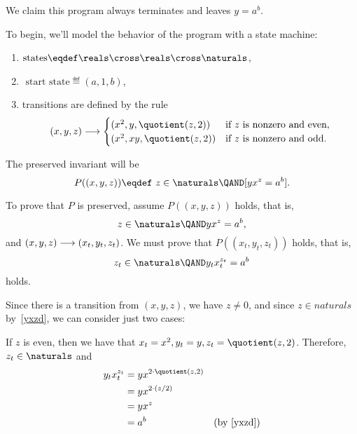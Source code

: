 
We claim this program always terminates and leaves $y = a^b$.

To begin, we'll model the behavior of the program with a state
machine:
\begin{enumerate}
\item $\text{states} \eqdef \reals \cross \reals \cross \naturals$,
\item $ \text{ start state} \eqdef (a,1,b)$,
\item transitions are defined by the rule
\begin{equation*}
(x,y,z) \movesto
\begin{cases}
(x^2, y, \quotient(z,2)) & \text{if $z$ is nonzero and even},\\
(x^2, xy, \quotient(z,2)) & \text{if $z$ is nonzero and odd}.
\end{cases}
\end{equation*}
\end{enumerate}

The preserved invariant will be
\[
P((x,y,z)) \eqdef\ z \in \naturals \QAND [yx^z = a^b].
\]

To prove that $P$ is preserved, assume $P((x,y,z))$ holds, that is,
\begin{equation}\label{yxzd}
z \in \naturals \QAND yx^z = a^b,
\end{equation}
and $(x,y,z) \mathrel{\longrightarrow} (x_t,y_t,z_t)$.  We must prove that
$P((x_t,y_t,z_t))$ holds, that is,
\[
z_t \in \naturals \QAND y_tx_t^{z_t} = a^b
\]
holds.

Since there is a transition from $(x,y,z)$, we have $z \neq 0$, and since
$z \in naturals$ by~\eqref{yxzd}, we can consider just two cases:

If $z$ is even, then we have that $x_t = x^2, y_t = y, z_t =
\quotient(z,2)$.  Therefore, $z_t \in \naturals$ and
\begin{align*}
y_tx_t^{z_t} &  = yx^{2 \cdot \quotient(z,2)}\\
           & = yx^{2 \cdot (z/2)}\\
           & = yx^z\\
          & = a^b & \mbox{(by~\eqref{yxzd})}
\end{align*}

